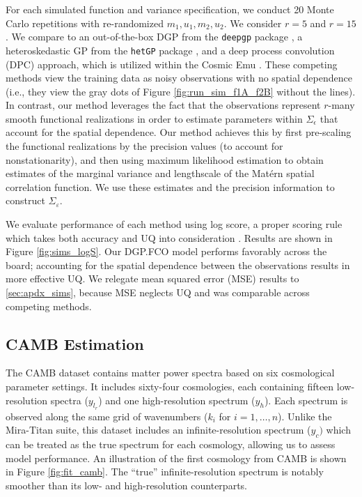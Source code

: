 \documentclass[11pt]{article}
\begin{document}
For each simulated function and variance specification, we conduct 20 Monte Carlo repetitions
with re-randomized $m_1, u_1, m_2, u_2$.  We consider $r = 5$ and $r = 15$.
We compare to an out-of-the-box DGP from the 
\texttt{deepgp} package \citep{sauer2023active}, a heteroskedastic GP from
the \texttt{hetGP} package \citep{binois2018practical, binois2021hetgp}, and
a deep process convolution (DPC) approach, which is utilized within the Cosmic 
Emu \citep{moran2023mira}.  These competing methods view the training data as 
noisy observations with no spatial dependence (i.e., they view the gray dots of
Figure \ref{fig:run_sim_f1A_f2B} without the lines). In
contrast, our method leverages the fact that the observations represent $r$-many
smooth functional realizations in order to estimate parameters
within $\Sigma_\epsilon$ that account for the spatial dependence.
Our method achieves this by first pre-scaling the functional realizations by the
precision values (to account for nonstationarity), and then using maximum likelihood
estimation to obtain estimates of the marginal variance and lengthscale of the 
Mat\'ern spatial correlation function. We use these estimates and the precision 
information to construct $\Sigma_\varepsilon$.

We evaluate performance of each method using log score, a proper scoring 
rule which takes both accuracy and UQ into 
consideration \citep[][lower is better]{gneiting2007strictly}.
Results are shown in Figure \ref{fig:sims_logS}.  Our DGP.FCO 
model performs favorably across the board; accounting for the spatial 
dependence between the observations results in more effective UQ.
We relegate mean squared error (MSE) results to \ref{sec:apdx_sims}, because
MSE neglects UQ and was comparable across competing methods.

\subsection{CAMB Estimation}
\label{subsec:camb}

The CAMB \citep{lewis2011CAMB} dataset contains matter power spectra based
on six cosmological parameter settings. It includes sixty-four cosmologies,
each containing fifteen low-resolution spectra ($y_{l_r}$) and one high-resolution spectrum ($y_h$).
Each spectrum is observed along the same grid of wavenumbers ($k_i$ for $i=1,\dots,n$). 
Unlike the Mira-Titan suite, this dataset includes an infinite-resolution 
spectrum ($y_c)$ which can be treated as the true spectrum for each cosmology,
allowing us to assess model performance. An illustration of the first cosmology 
from CAMB is shown in Figure \ref{fig:fit_camb}.  The ``true'' infinite-resolution 
spectrum is notably smoother than its low- and high-resolution counterparts.
\end{document}
